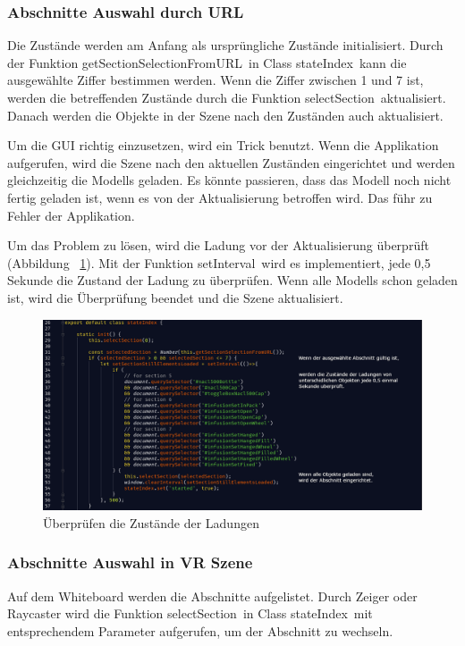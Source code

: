   \subsubsection{Abschnitte Auswahl durch URL}
  Die Zustände werden am Anfang als ursprüngliche Zustände initialisiert. Durch der Funktion \glqq getSectionSelectionFromURL\grqq\ in Class \glqq stateIndex\grqq\ kann die ausgewählte Ziffer bestimmen werden. Wenn die Ziffer zwischen 1 und 7 ist, werden die betreffenden Zustände durch die Funktion \glqq selectSection\grqq\ aktualisiert. Danach werden die Objekte in der Szene nach den Zuständen auch aktualisiert.
  
  Um die GUI richtig einzusetzen, wird ein Trick benutzt. Wenn die Applikation aufgerufen, wird die Szene nach den aktuellen Zuständen eingerichtet und werden gleichzeitig die Modells geladen. Es könnte passieren, dass das Modell noch nicht fertig geladen ist, wenn es von der Aktualisierung betroffen wird. Das führ zu Fehler der Applikation.
  
  Um das Problem zu lösen, wird die Ladung vor der Aktualisierung überprüft (Abbildung ~\ref{fig:checkLadung}). Mit der Funktion \glqq setInterval\grqq\ wird es implementiert, jede 0,5 Sekunde die Zustand der Ladung zu überprüfen. Wenn alle Modells schon geladen ist, wird die Überprüfung beendet und die Szene aktualisiert.
  
\begin{figure}[ht]
\vspace*{0.3cm}
\centering
\includegraphics[width=\textwidth]{images/checkLadung.png}
\caption[Überprüfen die Zustände der Ladungen]{Überprüfen die Zustände der Ladungen}
\label{fig:checkLadung} 
\end{figure}
  
  \subsubsection{Abschnitte Auswahl in VR Szene}
  Auf dem Whiteboard werden die Abschnitte aufgelistet. Durch Zeiger oder Raycaster wird die Funktion \glqq selectSection\grqq\ in Class \glqq stateIndex\grqq\ mit entsprechendem Parameter aufgerufen, um der Abschnitt zu wechseln.
  
